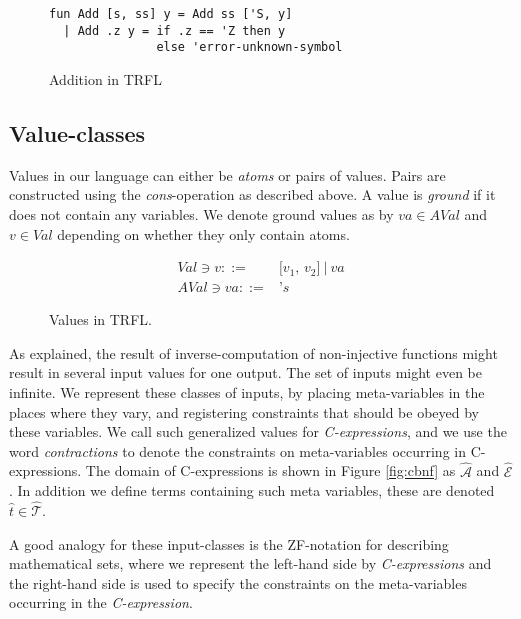 \documentclass[10pt]{../sigplanconf}
\begin{document}
\begin{figure}
  \centering
\begin{verbatim}
fun Add [s, ss] y = Add ss ['S, y]
  | Add .z y = if .z == 'Z then y
               else 'error-unknown-symbol
\end{verbatim}
  \caption{Addition in TRFL}
  \label{fig:addprog}
\end{figure}


\subsection{Value-classes}
Values in our language can either be \textit{atoms} or pairs of
values. Pairs are constructed using the \textit{cons}-operation as
described above. A value is \textit{ground} if it does not contain any
variables. We denote ground values as by $va \in AVal$ and $v \in Val$
depending on whether they only contain atoms.

\begin{figure}\centering
  \begin{align*}
    Val \ni v ::= & \texttt{[$v_1$, $v_2$]}\ |\ va\\
    AVal \ni va ::= & \texttt{'}s
  \end{align*}
  \caption{Values in TRFL.}
\label{fig:vbnf}
\end{figure}

As explained, the result of inverse-computation of non-injective
functions might result in several input values for one output. The set
of inputs might even be infinite. We represent these classes of
inputs, by placing meta-variables in the places where they vary, and
registering constraints that should be obeyed by these variables.  We
call such generalized values for \textit{C-expressions}, and we use
the word \textit{contractions} to denote the constraints on
meta-variables occurring in C-expressions. The domain of
C-expressions is shown in Figure \ref{fig:cbnf} as
$\mathcal{\widehat{A}}$ and $\mathcal{\widehat{E}}$. In addition we
define terms containing such meta variables, these are denoted
$\widehat{t} \in \widehat{\mathcal{T}}$.

A good analogy for these input-classes is the ZF-notation for
describing mathematical sets, where we represent the left-hand side by
\textit{C-expressions} and the right-hand side is used to specify the
constraints on the meta-variables occurring in the
\textit{C-expression}. 
\end{document}
